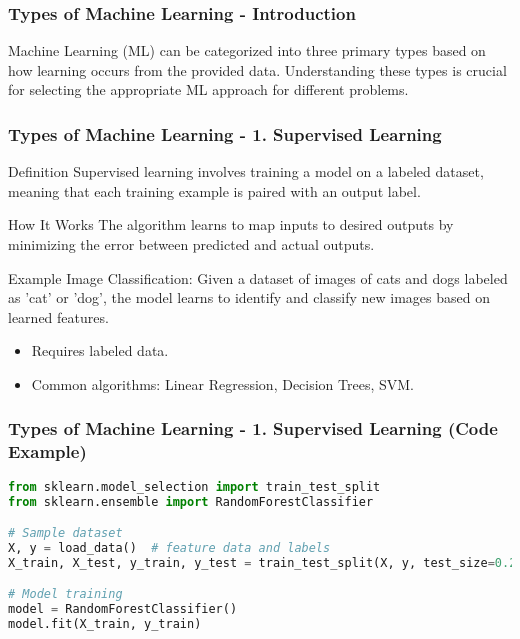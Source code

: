 \documentclass[aspectratio=169]{beamer}
\begin{document}
\begin{frame}[fragile]
    \frametitle{Types of Machine Learning - Introduction}
    Machine Learning (ML) can be categorized into three primary types based on how learning occurs from the provided data. Understanding these types is crucial for selecting the appropriate ML approach for different problems.
\end{frame}

\begin{frame}[fragile]
    \frametitle{Types of Machine Learning - 1. Supervised Learning}
    \begin{block}{Definition}
        Supervised learning involves training a model on a labeled dataset, meaning that each training example is paired with an output label.
    \end{block}
    
    \begin{block}{How It Works}
        The algorithm learns to map inputs to desired outputs by minimizing the error between predicted and actual outputs.
    \end{block}

    \begin{block}{Example}
        Image Classification: Given a dataset of images of cats and dogs labeled as 'cat' or 'dog', the model learns to identify and classify new images based on learned features.
    \end{block}

    \begin{itemize}
        \item Requires labeled data.
        \item Common algorithms: Linear Regression, Decision Trees, SVM.
    \end{itemize}
\end{frame}

\begin{frame}[fragile]
    \frametitle{Types of Machine Learning - 1. Supervised Learning (Code Example)}
    \begin{lstlisting}[language=Python]
from sklearn.model_selection import train_test_split
from sklearn.ensemble import RandomForestClassifier

# Sample dataset
X, y = load_data()  # feature data and labels
X_train, X_test, y_train, y_test = train_test_split(X, y, test_size=0.2)

# Model training
model = RandomForestClassifier()
model.fit(X_train, y_train)
    \end{lstlisting}
\end{frame}
\end{document}
